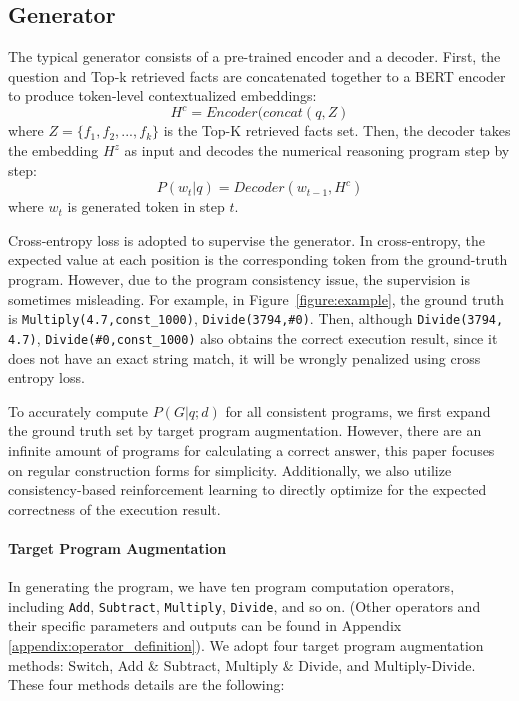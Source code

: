 \documentclass[11pt]{article}
\begin{document}
\subsection{Generator}
\label{sec:generator}

The typical generator consists of a pre-trained encoder and a decoder. First, the question and Top-k retrieved facts are concatenated together to a BERT encoder to produce token-level contextualized embeddings:
\begin{equation}
H^{c} = Encoder(concat(q,Z)
\end{equation}
where $Z = \{f_1,f_2,...,f_k\}$ is the Top-K retrieved facts set. Then, the decoder takes the embedding $H^{z}$ as input and decodes the numerical reasoning program step by step:
\begin{equation}
P(w_t|q) = Decoder(w_{t-1},H^{c})
\end{equation}
where $w_t$ is generated token in step $t$. 

Cross-entropy loss is adopted to supervise the generator. In cross-entropy, the expected value at each position is the corresponding token from the ground-truth program. However, due to the program consistency issue, the supervision is sometimes misleading. For example, in Figure~\ref{figure:example}, the ground truth is \texttt{Multiply(4.7,const\_1000)}, \texttt{Divide(3794,\#0)}. Then, although \texttt{Divide(3794, 4.7)}, \texttt{Divide(\#0,const\_1000)} also obtains the correct execution result, since it does not have an exact string match, it will be wrongly penalized using cross entropy loss.

To accurately compute $P(G|q;d)$ for all consistent programs, we first expand the ground truth set by target program augmentation. However, there are an infinite amount of programs for calculating a correct answer, this paper focuses on regular construction forms for simplicity. Additionally, we also utilize consistency-based reinforcement learning to directly optimize for the expected correctness of the execution result. 

\paragraph{Target Program Augmentation}
\label{sec:TPA}
In generating the program, we have ten program computation operators, including \texttt{Add}, \texttt{Subtract}, \texttt{Multiply}, \texttt{Divide}, and so on. (Other operators and their specific parameters and outputs can be found in Appendix \ref{appendix:operator_definition}). We adopt four target program augmentation methods: Switch, Add \& Subtract, Multiply \& Divide, and Multiply-Divide. These four methods details are the following:
\end{document}
